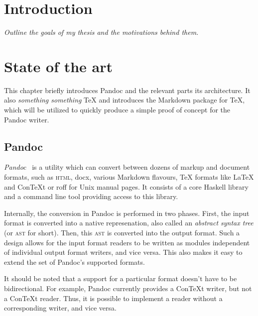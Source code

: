 \documentclass[
  digital,     %
  oneside,     %
  nosansbold,  %
  nocolorbold, %
  lof,         %
  lot,         %
]{fithesis4}
\begin{document}

\chapter{Introduction}
\emph{Outline the goals of my thesis and the motivations behind them.}

\chapter{State of the art}
This chapter briefly introduces Pandoc and the relevant parts its architecture. It also \emph{something something} \TeX{} and introduces the Markdown package for \TeX{}, which will be utilized to quickly produce a simple proof of concept for the Pandoc writer.

\section{Pandoc}
\emph{Pandoc}~\cite{pandoc} is a utility which can convert between dozens of markup and document formats, such as \textsc{html}, docx, various Markdown flavours, \TeX{} formats like \LaTeX{} and Con\TeX{}t or roff for Unix manual pages. It consists of a core Haskell library and a command line tool providing access to this library. %

Internally, the conversion in Pandoc is performed in two phases. First, the input format is converted into a native represenation, also called an \emph{abstract syntax tree} (or \textsc{ast} for short). Then, this \textsc{ast} is converted into the output format. Such a design allows for the input format readers to be written as modules independent of individual output format writers, and vice versa. This also makes it easy to extend the set of Pandoc's supported formats.

It should be noted that a support for a particular format doesn't have to be bidirectional. For example, Pandoc currently provides a Con\TeX{}t writer, but not a Con\TeX{}t reader. Thus, it is possible to implement a reader without a corresponding writer, and vice versa.
\end{document}

